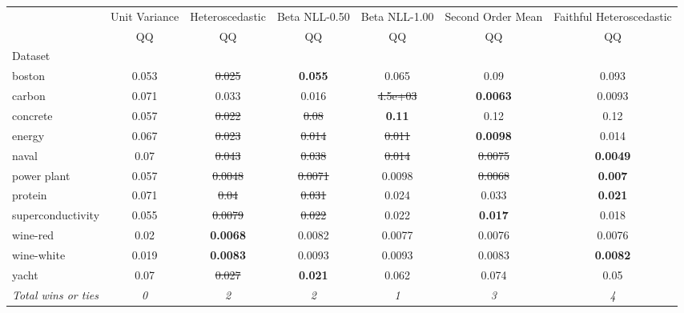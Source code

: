 \begin{tabular}{l|c|c|c|c|c|c}
\toprule
{} & {Unit Variance} & {Heteroscedastic} & {Beta NLL-0.50} & {Beta NLL-1.00} & {Second Order Mean} & {Faithful Heteroscedastic} \\
{} & {QQ} & {QQ} & {QQ} & {QQ} & {QQ} & {QQ} \\
{Dataset} & {} & {} & {} & {} & {} & {} \\
\midrule
boston & 0.053 & \sout{0.025} & \textbf{0.055} & 0.065 & 0.09 & 0.093 \\
carbon & 0.071 & 0.033 & 0.016 & \sout{4.5e+03} & \textbf{0.0063} & 0.0093 \\
concrete & 0.057 & \sout{0.022} & \sout{0.08} & \textbf{0.11} & 0.12 & 0.12 \\
energy & 0.067 & \sout{0.023} & \sout{0.014} & \sout{0.011} & \textbf{0.0098} & 0.014 \\
naval & 0.07 & \sout{0.043} & \sout{0.038} & \sout{0.014} & \sout{0.0075} & \textbf{0.0049} \\
power plant & 0.057 & \sout{0.0048} & \sout{0.0071} & 0.0098 & \sout{0.0068} & \textbf{0.007} \\
protein & 0.071 & \sout{0.04} & \sout{0.031} & 0.024 & 0.033 & \textbf{0.021} \\
superconductivity & 0.055 & \sout{0.0079} & \sout{0.022} & 0.022 & \textbf{0.017} & 0.018 \\
wine-red & 0.02 & \textbf{0.0068} & 0.0082 & 0.0077 & 0.0076 & 0.0076 \\
wine-white & 0.019 & \textbf{0.0083} & 0.0093 & 0.0093 & 0.0083 & \textbf{0.0082} \\
yacht & 0.07 & \sout{0.027} & \textbf{0.021} & 0.062 & 0.074 & 0.05 \\
\textit{{Total wins or ties}} & \textit{0} & \textit{2} & \textit{2} & \textit{1} & \textit{3} & \textit{4} \\
\bottomrule
\end{tabular}

